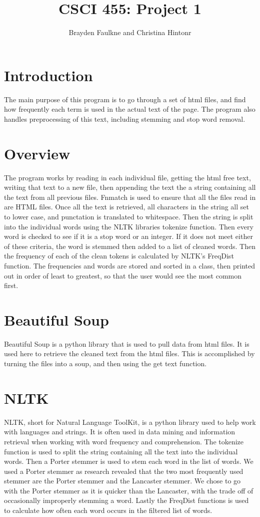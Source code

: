 \documentclass[12pt]{article}
\author{Brayden Faulkne and Christina Hintonr}
\title{CSCI 455: Project 1}
\begin{document}
\maketitle
\section{Introduction}
The main purpose of this program is to go through a set of html files, and find how frequently each term is used in the actual text of the page. The program also handles preprocessing of this text, including stemming and stop word removal. 
\section{Overview}
The program works by reading in each individual file, getting the html free text, writing that text to a new file, then appending the text the a string containing all the text from all previous files. Fnmatch is used to ensure that all the files read in are HTML files. Once all the text is retrieved, all characters in the string all set to lower case, and punctation is translated to whitespace. Then the string is split into the individual words using the NLTK libraries tokenize function. Then every word is checked to see if it is a stop word or an integer. If it does not meet either of these criteria, the word is stemmed then added to a list of cleaned words. Then the frequency of each of the clean tokens is calculated by NLTK's FreqDist function. The frequencies and words are stored and sorted in a class, then printed out in order of least to greatest, so that the user would see the most common first.
\section{Beautiful Soup}
Beautiful Soup is a python library that is used to pull data from html files. It is used here to retrieve the cleaned text from the html files. This is accomplished by turning the files into a soup, and then using the get text function.
\section{NLTK}
NLTK, short for Natural Language ToolKit, is a python library used to help work with languages and strings. It is often used in data mining and information retrieval when working with word frequency and comprehension. The tokenize function is used to split the string containing all the text into the individual words. Then a Porter stemmer is used to stem each word in the list of words. We used a Porter stemmer as research revealed that the two most frequently used stemmer are the Porter stemmer and the Lancaster stemmer. We chose to go with the Porter stemmer as it is quicker than the Lancaster, with the trade off of occasionally improperly stemming a word. Lastly the FreqDist functions is used to calculate how often each word occurs in the filtered list of words.
\end{document}
